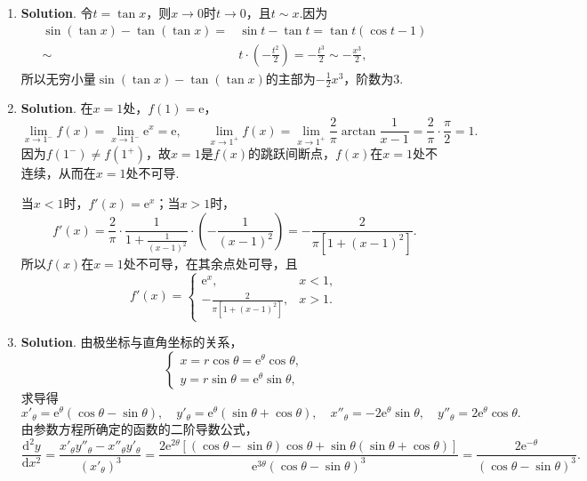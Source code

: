 \documentclass[../main.tex]{subfiles}
\begin{document}
\begin{enumerate}
    \item \textbf{Solution}. 令$t=\tan x$，则$x\to0$时$t\to0$，且$t\sim x$.因为
          \[
              \begin{aligned}
                  \sin(\tan x)-\tan(\tan x)= {} & \sin t-\tan t=\tan t\left(\cos t-1\right)                                 \\
                  \sim {}                       & t\cdot\left(-\frac{t^{2}}{2}\right)=-\frac{t^{3}}{2}\sim-\frac{x^{3}}{2},
              \end{aligned}
          \]
          所以无穷小量$\sin(\tan x)-\tan(\tan x)$的主部为$-\frac{1}{2}x^{3}$，阶数为3.

    \item \textbf{Solution}. 在$x=1$处，$f(1)=\mathrm{e}$，
          \[
              \lim_{x\to1^{-}}f(x)=\lim_{x\to1^{-}}\mathrm{e}^{x}=\mathrm{e},\qquad
              \lim_{x\to1^{+}}f(x)=\lim_{x\to1^{+}}\frac{2}{\pi}\arctan\frac{1}{x-1}=\frac{2}{\pi}\cdot\frac{\pi}{2}=1.
          \]
          因为$f(1^{-})\neq f(1^{+})$，故$x=1$是$f(x)$的跳跃间断点，$f(x)$在$x=1$处不连续，从而在$x=1$处不可导.

          当$x<1$时，$f'(x)=\mathrm{e}^{x}$；当$x>1$时，
          \[
              f'(x)=\frac{2}{\pi}\cdot\frac{1}{1+\frac{1}{(x-1)^{2}}}\cdot\left(-\frac{1}{(x-1)^{2}}\right)
              =-\frac{2}{\pi\left[1+(x-1)^{2}\right]}.
          \]
          所以$f(x)$在$x=1$处不可导，在其余点处可导，且
          \[
              f'(x)=
              \begin{cases}
                  \mathrm{e}^{x},                         & x<1, \\
                  -\frac{2}{\pi\left[1+(x-1)^{2}\right]}, & x>1.
              \end{cases}
          \]

    \item \textbf{Solution}. 由极坐标与直角坐标的关系，
          \[
              \begin{cases}
                  x=r\cos\theta=\mathrm{e}^{\theta}\cos\theta, \\
                  y=r\sin\theta=\mathrm{e}^{\theta}\sin\theta,
              \end{cases}
          \]
          求导得
          \[
              x'_{\theta}=\mathrm{e}^{\theta}\left(\cos\theta-\sin\theta\right),\quad
              y'_{\theta}=\mathrm{e}^{\theta}\left(\sin\theta+\cos\theta\right),\quad
              x''_{\theta}=-2\mathrm{e}^{\theta}\sin\theta,\quad
              y''_{\theta}=2\mathrm{e}^{\theta}\cos\theta.
          \]
          由参数方程所确定的函数的二阶导数公式，
          \[
              \frac{\mathrm{d}^{2}y}{\mathrm{d}x^{2}}=\frac{x'_{\theta}y''_{\theta}-x''_{\theta}y'_{\theta}}{\left(x'_{\theta}\right)^{3}}
              =\frac{2\mathrm{e}^{2\theta}\left[\left(\cos\theta-\sin\theta\right)\cos\theta+\sin\theta\left(\sin\theta+\cos\theta\right)\right]}{\mathrm{e}^{3\theta}\left(\cos\theta-\sin\theta\right)^{3}}
              =\frac{2\mathrm{e}^{-\theta}}{\left(\cos\theta-\sin\theta\right)^{3}}.
          \]


\end{enumerate}
\end{document}
